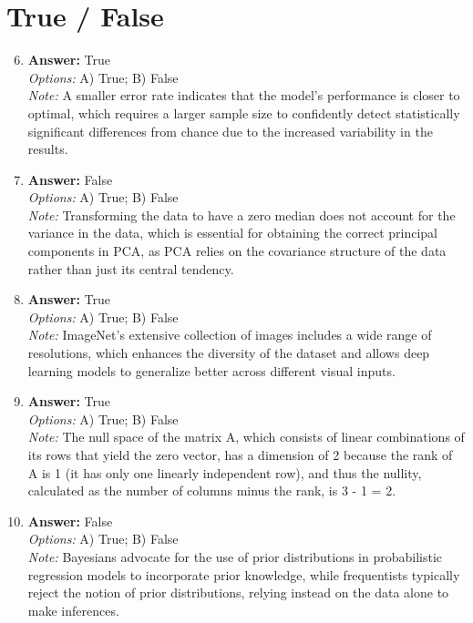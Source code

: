 \documentclass[12pt]{article}
\begin{document}
\section*{True / False}
\begin{enumerate}[label=\arabic*.]
\setcounter{enumi}{5}
\item \textbf{Answer:} True
\\ \textit{Options:} A) True; B) False
\\ \textit{Note:} A smaller error rate indicates that the model's performance is closer to optimal, which requires a larger sample size to confidently detect statistically significant differences from chance due to the increased variability in the results.
\item \textbf{Answer:} False
\\ \textit{Options:} A) True; B) False
\\ \textit{Note:} Transforming the data to have a zero median does not account for the variance in the data, which is essential for obtaining the correct principal components in PCA, as PCA relies on the covariance structure of the data rather than just its central tendency.
\item \textbf{Answer:} True
\\ \textit{Options:} A) True; B) False
\\ \textit{Note:} ImageNet's extensive collection of images includes a wide range of resolutions, which enhances the diversity of the dataset and allows deep learning models to generalize better across different visual inputs.
\item \textbf{Answer:} True
\\ \textit{Options:} A) True; B) False
\\ \textit{Note:} The null space of the matrix A, which consists of linear combinations of its rows that yield the zero vector, has a dimension of 2 because the rank of A is 1 (it has only one linearly independent row), and thus the nullity, calculated as the number of columns minus the rank, is 3 - 1 = 2.
\item \textbf{Answer:} False
\\ \textit{Options:} A) True; B) False
\\ \textit{Note:} Bayesians advocate for the use of prior distributions in probabilistic regression models to incorporate prior knowledge, while frequentists typically reject the notion of prior distributions, relying instead on the data alone to make inferences.
\end{enumerate}
\end{document}
